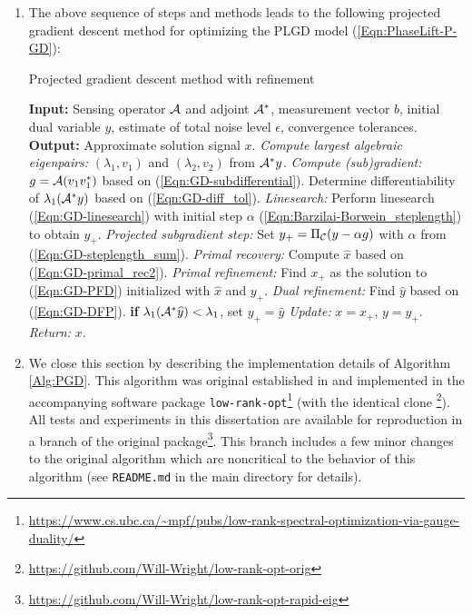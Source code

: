 \begin{enumerate}
\item
The above sequence of steps and methods leads to the following projected gradient descent method for optimizing the PLGD model  (\ref{Eqn:PhaseLift-P-GD}):
\begin{algorithm}[H]
\caption{Projected gradient descent method with refinement} 	\label{Alg:PGD}

\begin{algorithmic}[1]
	\Statex 	\textbf{Input:} Sensing operator ${\mathcal A}$ and adjoint ${\mathcal A}^*$, measurement vector $b$,
	initial dual variable $y$, estimate of total noise level $\epsilon$,  convergence
	tolerances.
	\Statex 	\textbf{Output:} Approximate solution signal $x$.
		\State 		\textit{Compute largest algebraic eigenpairs:} $(\lambda_1, v_1)$ and  $(\lambda_2, v_2)$ from ${\mathcal A}^*y$.
		\State 		\textit{Compute (sub)gradient:} $g = {\mathcal A}(v_1 v_1^*)$ based on  (\ref{Eqn:GD-subdifferential}).
		\State		Determine differentiability of $\lambda_1({\mathcal A}^*y)$ based on (\ref{Eqn:GD-diff_tol}).
			\State		\textit{Linesearch:} Perform linesearch (\ref{Eqn:GD-linesearch}) with initial step $\alpha$ (\ref{Eqn:Barzilai-Borwein_steplength}) to obtain $y_+$.	
		\Else
			\State		\textit{Projected subgradient step:} Set $y_+ = \Pi_{\mathcal C} (y - \alpha g)$ with $\alpha$ from (\ref{Eqn:GD-steplength_sum}).
		\EndIf
		\State		\textit{Primal recovery:} Compute $\hat{x}$ based on (\ref{Eqn:GD-primal_rec2}).
		\State		\textit{Primal refinement:} Find $x_+$ as the solution to (\ref{Eqn:GD-PFD}) initialized with $\hat{x}$ and $y_+$.
		 {}
			\State		\textit{Dual refinement:} Find $\widehat{y}$ based on (\ref{Eqn:GD-DFP}).
			\State		\textbf{if} $\lambda_1({\mathcal A}^* \widehat{y}) < \lambda_1$, set $y_+ = \widehat{y}$
		\EndIf
			\State	\textit{Update:} $x = x_+$, $y = y_+$.
	\EndWhile
	\State	\textit{Return:} $x$. 
\end{algorithmic}

\end{algorithm}





\item

We close this section by describing the implementation details of Algorithm \ref{Alg:PGD}.  This algorithm was original established in \cite{DBLP:journals/siamsc/FriedlanderM16} and implemented in the accompanying software package \texttt{low-rank-opt}\footnote{\url{https://www.cs.ubc.ca/~mpf/pubs/low-rank-spectral-optimization-via-gauge-duality/}} (with the identical clone \footnote{\url{https://github.com/Will-Wright/low-rank-opt-orig}}).  All tests and experiments in this dissertation are available for reproduction in a branch of the original package\footnote{\url{https://github.com/Will-Wright/low-rank-opt-rapid-eig}}.  This branch includes a few minor changes to the original algorithm which are noncritical to the behavior of this algorithm (see \texttt{README.md} in the main directory for details).



\end{enumerate}

